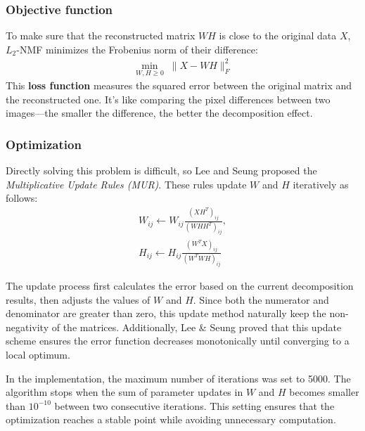 \subsubsection{Objective function}
To make sure that the reconstructed matrix \(WH\) is close to the original data \(X\), $L_2$-NMF minimizes the Frobenius norm of their difference:
\begin{align}
    \min_{W,H \geq 0} \; \|X - WH\|_F^2
\end{align}
This \textbf{loss function} measures the squared error between the original matrix and the reconstructed one. It's like comparing the pixel differences between two images—the smaller the difference, the better the decomposition effect\cite{lee2001algorithms}.

\subsubsection{Optimization}
Directly solving this problem is difficult, so Lee and Seung \cite{lee2001algorithms} proposed the \textit{Multiplicative Update Rules (MUR)}. These rules update \(W\) and \(H\) iteratively as follows:
\begin{align}
    W_{ij} \leftarrow W_{ij} \frac{(X H^T)_{ij}}{(W H H^T)_{ij}}, \\
    H_{ij} \leftarrow H_{ij} \frac{(W^T X)_{ij}}{(W^T W H)_{ij}}
\end{align}

The update process first calculates the error based on the current decomposition results, then adjusts the values of $W$ and $H$. Since both the numerator and denominator are greater than zero, this update method naturally keep the non-negativity of the matrices. Additionally, Lee \& Seung\cite{lee2001algorithms} proved that this update scheme ensures the error function decreases monotonically until converging to a local optimum.

In the implementation, the maximum number of iterations was set to 5000. The algorithm stops when the sum of parameter updates in $W$ and $H$ becomes smaller than $10^{-10}$ between two consecutive iterations. This setting ensures that the optimization reaches a stable point while avoiding unnecessary computation.


